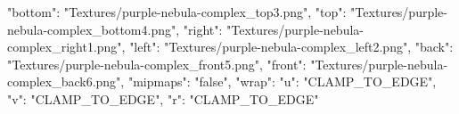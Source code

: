 {
  "bottom": "Textures/purple-nebula-complex_top3.png",
  "top": "Textures/purple-nebula-complex_bottom4.png",
  "right": "Textures/purple-nebula-complex_right1.png",
  "left": "Textures/purple-nebula-complex_left2.png",
  "back": "Textures/purple-nebula-complex_front5.png",
  "front": "Textures/purple-nebula-complex_back6.png",
  "mipmaps": "false",
  "wrap": {
    "u": "CLAMP_TO_EDGE",
    "v": "CLAMP_TO_EDGE",
    "r": "CLAMP_TO_EDGE"
  }
}